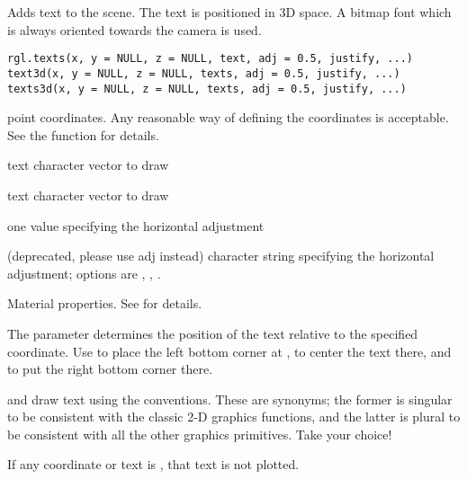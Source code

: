 \documentclass{article}
\begin{document}
\begin{Description}\relax
Adds text to the scene. The text is positioned in 3D space. 
A bitmap font which is always oriented towards the camera is used.
\end{Description}
\begin{Usage}
\begin{verbatim}
rgl.texts(x, y = NULL, z = NULL, text, adj = 0.5, justify, ...)
text3d(x, y = NULL, z = NULL, texts, adj = 0.5, justify, ...) 
texts3d(x, y = NULL, z = NULL, texts, adj = 0.5, justify, ...) 
\end{verbatim}
\end{Usage}
\begin{Arguments}
\begin{ldescription}
\item[\code{x, y, z}] point coordinates.  Any reasonable way of defining the
coordinates is acceptable.  See the function 
for details.
\item[\code{text}] text character vector to draw
\item[\code{texts}] text character vector to draw
\item[\code{adj}] one value specifying the horizontal adjustment 
\item[\code{justify}] (deprecated, please use adj instead) character string
specifying the horizontal adjustment; options are , ,
.

\item[\code{ ... }] Material properties. See  for details.
\end{ldescription}
\end{Arguments}
\begin{Details}\relax
The  parameter determines the position of the text relative to the 
specified coordinate.  Use  to place the left bottom corner at
,  to center the text there, and 
to put the right bottom corner there.

 and  draw text using the 
conventions. These are synonyms; the former is singular to be
consistent with the classic 2-D graphics functions, and the latter is
plural to be consistent with all the other graphics primitives.  Take
your choice!

If any coordinate or text is , that text is not plotted.
\end{Details}
\end{document}
